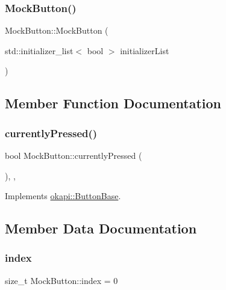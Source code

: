 \subsubsection{\texorpdfstring{MockButton()}{MockButton()}}
{\footnotesize\ttfamily Mock\+Button\+::\+Mock\+Button (\begin{DoxyParamCaption}\item[{std\+::initializer\+\_\+list$<$ bool $>$}]{initializer\+List }\end{DoxyParamCaption})\hspace{0.3cm}{\ttfamily [inline]}}



\subsection{Member Function Documentation}
\mbox{\label{classMockButton_a3b2cee3f3164c665ad4f4184ef05bcc2}} 
\subsubsection{\texorpdfstring{currentlyPressed()}{currentlyPressed()}}
{\footnotesize\ttfamily bool Mock\+Button\+::currently\+Pressed (\begin{DoxyParamCaption}{ }\end{DoxyParamCaption})\hspace{0.3cm}{\ttfamily [inline]}, {\ttfamily [override]}, {\ttfamily [virtual]}}



Implements \mbox{\hyperlink{classokapi_1_1ButtonBase_a748b6f2b5ebce9fa9f6bbc9d170d3d7a}{okapi\+::\+Button\+Base}}.



\subsection{Member Data Documentation}
\mbox{\label{classMockButton_af6dd5ac3c3d59f8536984cc8c30d377c}} 
\subsubsection{\texorpdfstring{index}{index}}
{\footnotesize\ttfamily size\+\_\+t Mock\+Button\+::index = 0}

